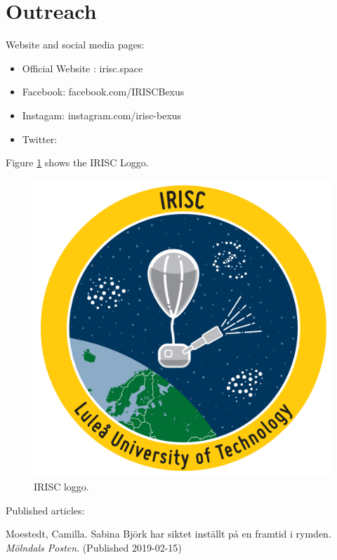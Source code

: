 \newpage
\section{Outreach} \label{sec:appB}

Website and social media pages: 

\begin{itemize}
	\item Official Website : irisc.space
	\item Facebook: facebook.com/IRISCBexus
	\item Instagam: instagram.com/irisc-bexus
	\item Twitter: 
\end{itemize}

Figure \ref{fig:loggo} shows the IRISC Loggo.

\begin{figure}[H]
	\centering
	\includegraphics[scale=0.1]{0-cover/img/logo-irisc.png}
	\caption{IRISC loggo.}
	\label{fig:loggo}
\end{figure}

Published articles: 

Moestedt, Camilla. Sabina Björk har siktet inställt på en framtid i rymden. \textit{Mölndals Posten}. (Published 2019-02-15)